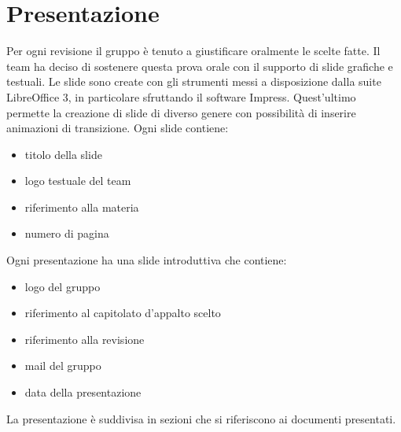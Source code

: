 \documentclass[a4paper,11pt]{article}
\begin{document}
\section{Presentazione}
Per ogni revisione il gruppo \`e tenuto a giustificare oralmente le scelte fatte. Il team ha deciso di sostenere questa prova orale con il supporto di slide grafiche e testuali. Le slide sono create con gli strumenti messi a disposizione dalla suite LibreOffice 3, in particolare sfruttando il software Impress. Quest'ultimo permette la creazione di slide di diverso genere con possibilit\`a di inserire animazioni di transizione.
Ogni slide contiene:
\begin{itemize}
\item titolo della slide 
\item logo testuale del team
\item riferimento alla materia
\item numero di pagina
\end{itemize}
Ogni presentazione ha una slide introduttiva che contiene:
\begin{itemize}
\item logo del gruppo
\item riferimento al capitolato d'appalto scelto
\item riferimento alla revisione
\item mail del gruppo
\item data della presentazione
\end{itemize}
La presentazione \`e suddivisa in sezioni che si riferiscono ai documenti presentati.
\end{document}
